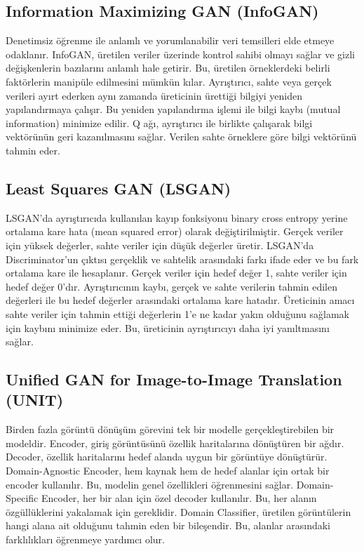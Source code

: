 \subsection{Information Maximizing GAN (InfoGAN)}

Denetimsiz öğrenme ile anlamlı ve yorumlanabilir veri temsilleri elde etmeye odaklanır. InfoGAN, üretilen veriler üzerinde kontrol sahibi olmayı sağlar ve gizli değişkenlerin bazılarını anlamlı hale getirir. Bu, üretilen örneklerdeki belirli faktörlerin manipüle edilmesini mümkün kılar. Ayrıştırıcı, sahte veya gerçek verileri ayırt ederken aynı zamanda üreticinin ürettiği bilgiyi yeniden yapılandırmaya çalışır. Bu yeniden yapılandırma işlemi ile bilgi kaybı (mutual information) minimize edilir. Q ağı, ayrıştırıcı ile birlikte çalışarak bilgi vektörünün geri kazanılmasını sağlar. Verilen sahte örneklere göre bilgi vektörünü tahmin eder. 

\newpage

\subsection{Least Squares GAN (LSGAN)}

LSGAN'da ayrıştırıcıda kullanılan kayıp fonksiyonu binary cross entropy yerine ortalama kare hata (mean squared error) olarak değiştirilmiştir. Gerçek veriler için yüksek değerler, sahte veriler için düşük değerler üretir. LSGAN'da Discriminator'un çıktısı gerçeklik ve sahtelik arasındaki farkı ifade eder ve bu fark ortalama kare ile hesaplanır. Gerçek veriler için hedef değer 1, sahte veriler için hedef değer 0'dır. Ayrıştırıcının kaybı, gerçek ve sahte verilerin tahmin edilen değerleri ile bu hedef değerler arasındaki ortalama kare hatadır. Üreticinin amacı sahte veriler için tahmin ettiği değerlerin 1'e ne kadar yakın olduğunu sağlamak için kaybını minimize eder. Bu, üreticinin ayrıştırıcıyı daha iyi yanıltmasını sağlar.

\newpage

\subsection{Unified GAN for Image-to-Image Translation (UNIT)}

Birden fazla görüntü dönüşüm görevini tek bir modelle gerçekleştirebilen bir modeldir. Encoder, giriş görüntüsünü özellik haritalarına dönüştüren bir ağdır. Decoder, özellik haritalarını hedef alanda uygun bir görüntüye dönüştürür. Domain-Agnostic Encoder, hem kaynak hem de hedef alanlar için ortak bir encoder kullanılır. Bu, modelin genel özellikleri öğrenmesini sağlar. Domain-Specific Encoder, her bir alan için özel decoder kullanılır. Bu, her alanın özgüllüklerini yakalamak için gereklidir. Domain Classifier, üretilen görüntülerin hangi alana ait olduğunu tahmin eden bir bileşendir. Bu, alanlar arasındaki farklılıkları öğrenmeye yardımcı olur. 


